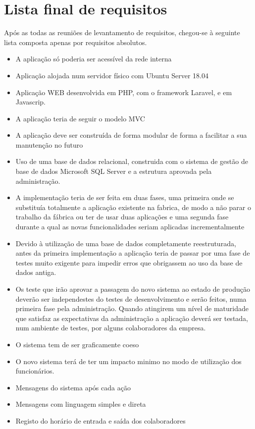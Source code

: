 \section{Lista final de requisitos}
Após as todas as reuniões de levantamento de requisitos, chegou-se à seguinte lista composta apenas por requisitos absolutos.
\begin{itemize}
	\item A aplicação só poderia ser acessível da rede interna
	\item Aplicação alojada num servidor físico com Ubuntu Server 18.04
	\item Aplicação WEB desenvolvida em PHP, com o framework Laravel, e em Javascrip.
	\item A aplicação teria de seguir o modelo MVC\label{sym:MVC}
	\item A aplicação deve ser construída de forma modular de forma a facilitar a sua manutenção no futuro
	\item Uso de uma base de dados relacional, construida com o sistema de gestão de base de dados Microsoft SQL Server e a estrutura aprovada pela administração.
	\item A implementação teria de ser feita em duas fases, uma primeira onde se substituía totalmente a aplicação existente na fabrica, de modo a não parar o trabalho da fábrica ou ter de usar duas aplicações e uma segunda fase durante a qual as novas funcionalidades seriam aplicadas incrementalmente
	\item Devido à utilização de uma base de dados completamente reestruturada, antes da primeira implementação a aplicação teria de passar por uma fase de testes muito exigente para impedir erros que obrigassem ao uso da base de dados antiga.
	\item Os teste que irão aprovar a passagem do novo sistema ao estado de produção deverão ser independestes do testes de desenvolvimento e serão feitos, numa primeira fase pela administração. Quando atingirem um nível de maturidade que satisfaz as expectativas da administração a aplicação deverá ser testada, num ambiente de testes, por alguns colaboradores da empresa.
	\item O sistema tem de ser graficamente coeso
	\item O novo sistema terá de ter um impacto minimo no modo de utilização dos funcionários.
	\item Mensagens do sistema após cada ação
	\item Mensagens com linguagem simples e direta
	\item Registo do horário de entrada e saída dos colaboradores

\end{itemize}
